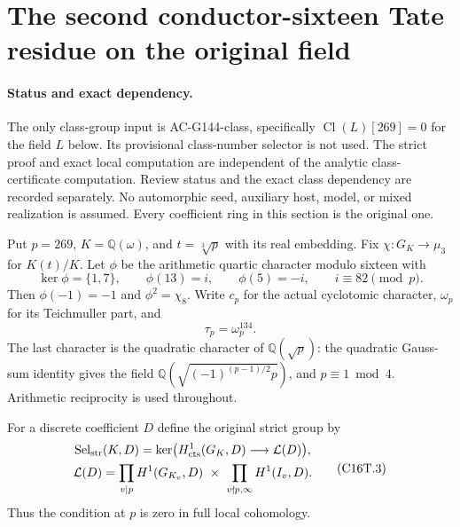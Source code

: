 \section{The second conductor-sixteen Tate residue on the original field}
\label{sec:conductor16-second-residue-strict}

\paragraph{Status and exact dependency.}
The only class-group input is AC-G144-class, specifically
$\operatorname{Cl}(L)[269]=0$ for the field $L$ below.
Its provisional class-number selector is not used.
The strict proof and exact local computation are independent of
the analytic class-certificate computation.  Review status and
the exact class dependency are recorded separately.
No automorphic seed, auxiliary host, model, or mixed realization
is assumed.  Every coefficient ring in this section is the original one.

Put $p=269$, $K=\mathbb Q(\omega)$, and $t=\sqrt[3]{p}$ with its
real embedding.  Fix $\chi:G_K\longrightarrow\mu_3$ for $K(t)/K$.
Let $\phi$ be the arithmetic quartic character modulo sixteen with
\[
 \ker\phi=\{1,7\},\qquad \phi(13)=i,\qquad
 \phi(5)=-i,\qquad i\equiv82\pmod p .
 \tag{C16T.1}
\]
Then $\phi(-1)=-1$ and $\phi^2=\chi_8$.
Write $c_p$ for the actual cyclotomic character, $\omega_p$ for
its Teichmuller part, and
\[
             \tau_p=\omega_p^{134}.
 \tag{C16T.2}
\]
The last character is the quadratic character of
$\mathbb Q(\sqrt p)$: the quadratic Gauss-sum identity gives
the field $\mathbb Q(\sqrt{(-1)^{(p-1)/2}p})$, and $p\equiv1\bmod4$.
Arithmetic reciprocity is used throughout.

For a discrete coefficient $D$ define the original strict group by
\[
 \begin{gathered}
 \operatorname{Sel}_{\rm str}(K,D)=
 \ker\bigl(H^1_{\rm cts}(G_K,D)\longrightarrow\mathcal L(D)\bigr),\\
 \mathcal L(D)=
 \prod_{v\mid p}H^1(G_{K_v},D)\ \times\
 \prod_{v\nmid p,\infty}H^1(I_v,D).
 \end{gathered}
 \tag{C16T.3}
\]
Thus the condition at $p$ is zero in full local cohomology.


